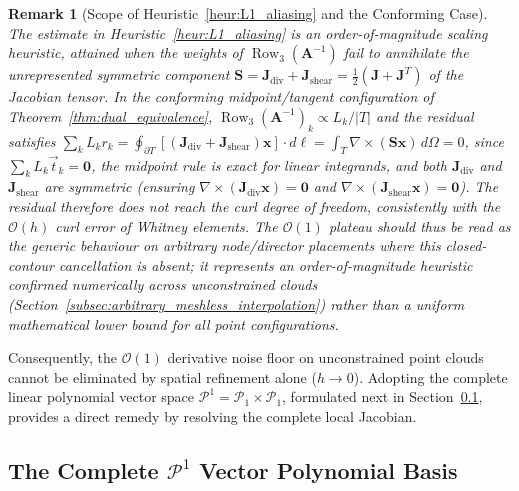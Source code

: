 \documentclass[preprint,12pt]{elsarticle}
\newtheorem{remark}{Remark}
\begin{document}
\begin{remark}[Scope of Heuristic~\ref{heur:L1_aliasing} and the Conforming Case]
    \label{rem:heur1_scope}
    The estimate in Heuristic~\ref{heur:L1_aliasing} is an order-of-magnitude scaling heuristic, attained when the weights of $\operatorname{Row}_3(\mathbf{A}^{-1})$ fail to annihilate the unrepresented symmetric component $\mathbf{S} = \mathbf{J}_{\mathrm{div}} + \mathbf{J}_{\mathrm{shear}} = \frac{1}{2}(\mathbf{J} + \mathbf{J}^T)$ of the Jacobian tensor. In the conforming midpoint/tangent configuration of Theorem~\ref{thm:dual_equivalence}, $\operatorname{Row}_3(\mathbf{A}^{-1})_k \propto L_k/|T|$ and the residual satisfies $\sum_k L_k r_k = \oint_{\partial T}[(\mathbf{J}_{\mathrm{div}} + \mathbf{J}_{\mathrm{shear}})\mathbf{x}]\cdot d\boldsymbol{\ell} = \int_T \nabla\times(\mathbf{S}\mathbf{x})\,d\Omega = 0$, since $\sum_k L_k \vec{t}_k=\mathbf{0}$, the midpoint rule is exact for linear integrands, and both $\mathbf{J}_{\mathrm{div}}$ and $\mathbf{J}_{\mathrm{shear}}$ are symmetric (ensuring $\nabla\times(\mathbf{J}_{\mathrm{div}}\mathbf{x}) = \mathbf{0}$ and $\nabla\times(\mathbf{J}_{\mathrm{shear}}\mathbf{x}) = \mathbf{0}$). The residual therefore does not reach the curl degree of freedom, consistently with the $\mathcal{O}(h)$ curl error of Whitney elements. The $\mathcal{O}(1)$ plateau should thus be read as the generic behaviour on arbitrary node/director placements where this closed-contour cancellation is absent; it represents an order-of-magnitude heuristic confirmed numerically across unconstrained clouds (Section~\ref{subsec:arbitrary_meshless_interpolation}) rather than a uniform mathematical lower bound for all point configurations.
\end{remark}

Consequently, the $\mathcal{O}(1)$ derivative noise floor on unconstrained point clouds cannot be eliminated by spatial refinement alone ($h \to 0$). Adopting the complete linear polynomial vector space $\mathcal{P}^1 = \mathcal{P}_1 \times \mathcal{P}_1$, formulated next in Section~\ref{subsec:complete_P1_basis}, provides a direct remedy by resolving the complete local Jacobian.


\subsection{The Complete \texorpdfstring{$\mathcal{P}^1$}{P1} Vector Polynomial Basis}
\label{subsec:complete_P1_basis}
\end{document}
